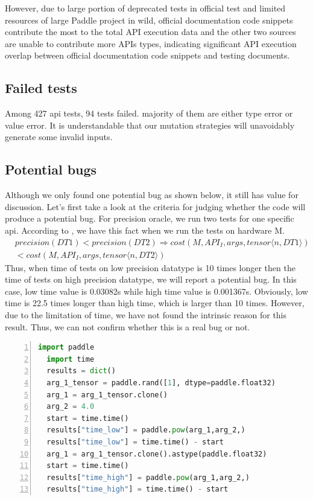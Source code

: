 \documentclass[sigconf]{acmart}
\begin{document}
  However, due to large portion of deprecated tests in official test and limited resources of large Paddle project in wild, official documentation code snippets contribute the most to the total API execution data and the other two sources are unable to contribute more APIs types,
  indicating significant API execution overlap between official documentation code snippets and testing documents.
  \subsection{Failed tests}
  Among 427 api tests, 94 tests failed. majority of them are either type error or value error. It is understandable that our mutation strategies will unavoidably generate some invalid inputs.
  \subsection{Potential bugs}
  Although we only found one potential bug as shown below, it still has value for discussion.
  Let's first take a look at the criteria for judging whether the code will produce a potential bug.
  For precision oracle, we run two tests for one specific api. According to \cite{w1}, we have this fact when 
  we run the tests on hardware M.
  \begin{equation}
    \begin{aligned}
      & precision(DT1) < precision(DT2) \Rightarrow cost(M, API_I, args, tensor \langle n, DT1 \rangle) \\
      & < cost(M, API_I, args, tensor \langle n, DT2 \rangle)
    \end{aligned}
  \end{equation}
  Thus, when time of tests on low precision datatype is 10 times longer then the time of tests on high precision datatype, we will report a potential bug. 
  In this case, low time value is 0.03082s while high time value is 0.001367s. Obviously, low time is 22.5 times longer than high time, which is larger than 10 times.
  However, due to the limitation of time, we have not found the intrinsic reason for this result. Thus, we can not confirm whether this is a real bug or not.
    
  
  \begin{lstlisting}[language=Python, numbers=left, caption={Potential bug when excuting precision oracle}, label={lst:potential_bug}]
  import paddle
  import time
  results = dict()
  arg_1_tensor = paddle.rand([1], dtype=paddle.float32)
  arg_1 = arg_1_tensor.clone()
  arg_2 = 4.0
  start = time.time()
  results["time_low"] = paddle.pow(arg_1,arg_2,)
  results["time_low"] = time.time() - start
  arg_1 = arg_1_tensor.clone().astype(paddle.float32)
  start = time.time()
  results["time_high"] = paddle.pow(arg_1,arg_2,)
  results["time_high"] = time.time() - start
\end{lstlisting}
\end{document}
